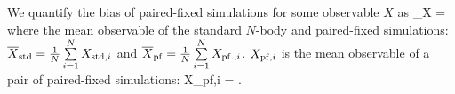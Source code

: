 We quantify the bias of paired-fixed simulations for some observable $X$ as
\beq
\beta_X = 
\eeq
where the mean observable of the standard $N$-body and paired-fixed 
simulations: $\overline{X}_{\rm std} = \frac{1}{N}\sum\limits_{i=1}^{N} X_{{\rm std}, i}$ 
and $\overline{X}_{\rm pf} = \frac{1}{N}\sum\limits_{i=1}^{N} X_{{\rm pf.}, i}$. 
$X_{{\rm pf},i}$ is the mean observable of a pair of paired-fixed simulations: 
\beq
X_{{\rm pf},i} =  \big[ X_{{\rm pf},i}^{(1)} + X_{{\rm pf},i}^{(2)}\big].
\eeq



